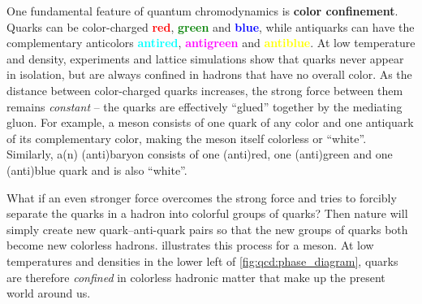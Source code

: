 \begin{figure}
\centering
{}
\caption{\label{fig:lsm:confinement}%
}
\end{figure}

One fundamental feature of quantum chromodynamics is \textbf{color confinement}.
Quarks can be color-charged \textcolor{red}{\textbf{red}}, \textcolor{green}{\textbf{green}} and \textcolor{blue}{\textbf{blue}},
while antiquarks can have the complementary anticolors \textcolor{cyan}{\textbf{antired}}, \textcolor{magenta}{\textbf{antigreen}} and \textcolor{yellow}{\textbf{antiblue}}.
At low temperature and density, experiments and lattice simulations show that quarks never appear in isolation, but are always confined in hadrons that have no overall color.
As the distance between color-charged quarks increases, the strong force between them remains \emph{constant} -- the quarks are  effectively ``glued'' together by the mediating gluon.
For example, a meson consists of one quark of any color and one antiquark of its complementary color, making the meson itself colorless or ``white''.
Similarly, a(n) (anti)baryon consists of one (anti)red, one (anti)green and one (anti)blue quark and is also ``white''.

What if an even stronger force overcomes the strong force and tries to forcibly separate the quarks in a hadron into colorful groups of quarks?
Then nature will simply create new quark--anti-quark pairs so that the new groups of quarks both become new colorless hadrons.
 illustrates this process for a meson.
At low temperatures and densities in the lower left of \cref{fig:qcd:phase_diagram}, quarks are therefore \emph{confined} in colorless hadronic matter that make up the present world around us.

